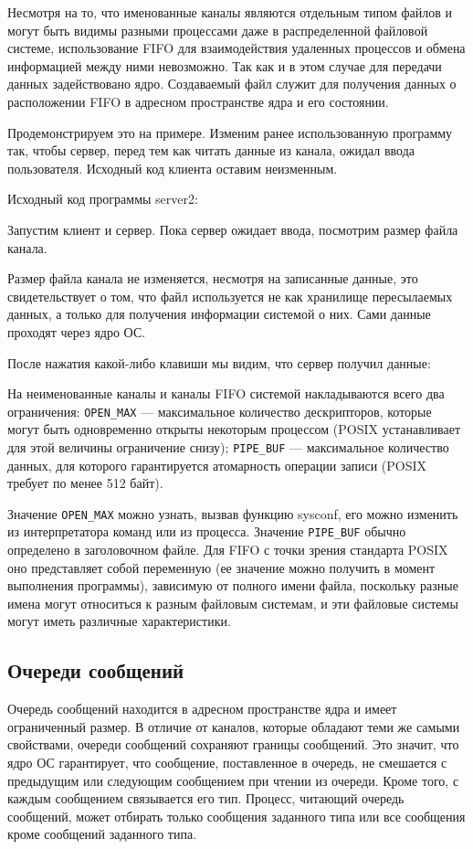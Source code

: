 \documentclass[a4paper]{article}
\begin{document}
	Несмотря на то, что именованные каналы являются отдельным типом файлов и могут быть видимы разными процессами даже в распределенной файловой системе, использование FIFO для взаимодействия удаленных процессов и обмена информацией между ними невозможно. Так как и в этом случае для передачи данных задействовано ядро. Создаваемый файл служит для получения данных о расположении FIFO в адресном пространстве ядра и его состоянии.
	
	Продемонстрируем это на примере. Изменим ранее использованную программу так, чтобы сервер, перед тем как читать данные из канала, ожидал ввода пользователя. Исходный код клиента оставим неизменным.

	Исходный код программы server2:
	

	Запустим клиент и сервер. Пока сервер ожидает ввода, посмотрим размер файла канала.
	
 	
 	Размер файла канала не изменяется, несмотря на записанные данные, это свидетельствует о том, что файл используется не как хранилище пересылаемых данных, а только для получения информации системой о них. Сами данные проходят через ядро ОС.
 	
 	После нажатия какой-либо клавиши мы видим, что сервер получил данные:
	

	На неименованные каналы и каналы FIFO системой накладываются всего два ограничения: \texttt{OPEN\_MAX} --- максимальное количество дескрипторов, которые могут быть одновременно открыты некоторым процессом (POSIX устанавливает для этой величины ограничение снизу); \texttt{PIPE\_BUF} --- максимальное количество данных, для которого гарантируется атомарность операции записи (POSIX требует по менее 512 байт).
	
	Значение \texttt{OPEN\_MAX} можно узнать, вызвав функцию sysconf, его можно изменить из интерпретатора команд или из процесса. Значение \texttt{PIPE\_BUF} обычно определено в заголовочном файле. Для FIFO с точки зрения стандарта POSIX оно представляет собой переменную (ее значение можно получить в момент выполнения программы), зависимую от полного имени файла, поскольку разные имена могут относиться к разным файловым системам, и эти файловые системы могут иметь различные характеристики.

\subsection{Очереди сообщений}
	Очередь сообщений находится в адресном пространстве ядра и имеет ограниченный размер. В отличие от каналов, которые обладают теми же самыми свойствами, очереди сообщений сохраняют границы сообщений. Это значит, что ядро ОС гарантирует, что сообщение, поставленное в очередь, не смешается с предыдущим или следующим сообщением при чтении из очереди. Кроме того, с каждым сообщением связывается его тип. Процесс, читающий очередь сообщений, может отбирать только сообщения заданного типа или все сообщения кроме сообщений заданного типа.
	
\end{document}
